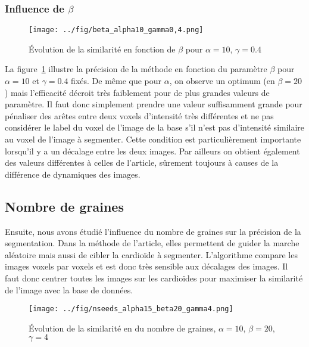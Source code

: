 \documentclass{article}
\begin{document}
\subsubsection{Influence de $\beta$}

\begin{figure}[h!]
  \begin{center}
    \caption{Évolution de la similarité en fonction de $\beta$ pour $\alpha=10$, $\gamma=0.4$}
    \texttt{[image: ../fig/beta\_alpha10\_gamma0,4.png]}
    \label{fig:beta}
  \end{center}
\end{figure}

La figure~\ref{fig:beta} illustre la précision de la méthode en fonction du paramètre $\beta$ pour $\alpha=10$ et $\gamma=0.4$ fixés. De même que pour $\alpha$, on observe un optimum (en $\beta=20$) mais l’efficacité décroit très faiblement pour de plus grandes valeurs de paramètre. Il faut donc simplement prendre une valeur suffisamment grande pour pénaliser des arêtes entre deux voxels d’intensité très différentes et ne pas considérer le label du voxel de l’image de la base s’il n’est pas d’intensité similaire au voxel de l’image à segmenter. Cette condition est particulièrement importante lorsqu'il y a un décalage entre les deux images. 
Par ailleurs on obtient également des valeurs différentes à celles de l’article, sûrement toujours à causes de la différence de dynamiques des images.


\subsection{Nombre de graines}

Ensuite, nous avons étudié l’influence du nombre de graines sur la précision de la segmentation. Dans la méthode de l’article, elles permettent de guider la marche aléatoire mais aussi de cibler la cardioïde à segmenter. L’algorithme compare les images voxels par voxels et est donc très sensible aux décalages des images. Il faut donc centrer toutes les images sur les cardioïdes pour maximiser la similarité de l’image avec la base de données. 


\begin{figure}[h!]
  \begin{center}
    \caption{Évolution de la similarité en du nombre de graines, $\alpha=10$, $\beta=20$, $\gamma=4$}
    \texttt{[image: ../fig/nseeds\_alpha15\_beta20\_gamma4.png]}
    \label{fig:nseeds}
  \end{center}
\end{figure}
\end{document}
